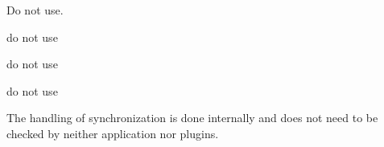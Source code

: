 
\begin{DoxyRefList}
\item[Member \mbox{\hyperlink{group__invoke_gaae89e2497eba478be2043f1b25adbb3c}{elektra\+Invoke\+Initialize}} (const char $\ast$elektra\+Plugin\+Name)]\label{deprecated__deprecated000003}%
%
Do not use. 
\item[Member \mbox{\hyperlink{classkdb_1_1tools_1_1Modules_ae8d8c91745c9f517e6e8a556f1664f69}{kdb\+::tools\+::Modules\+::load}} (std\+::string const \&plugin\+Name)]\label{deprecated__deprecated000004}%
%
do not use  
\item[Member \mbox{\hyperlink{classkdb_1_1tools_1_1Modules_a6ae72cc8e30fe3fb0aabd6f78fad8ddf}{kdb\+::tools\+::Modules\+::load}} (std\+::string const \&plugin\+Name, \mbox{\hyperlink{classkdb_1_1KeySet}{kdb\+::\+Key\+Set}} const \&config)]\label{deprecated__deprecated000005}%
%
do not use  
\item[Member \mbox{\hyperlink{group__key_gga9b703ca49f48b482def322b77d3e6bc8ab089c5e7977d6e58737eb586ee153b7f}{KEY\+\_\+\+NULL}} ]\label{deprecated__deprecated000001}%
%
do not use  
\item[Member \mbox{\hyperlink{group__keytest_gaf247df0de7aca04b32ef80e39ef12950}{key\+Need\+Sync}} (const \mbox{\hyperlink{classkdb_1_1Key}{Key}} $\ast$key)]\label{deprecated__deprecated000002}%
%
The handling of synchronization is done internally and does not need to be checked by neither application nor plugins.
\end{DoxyRefList}